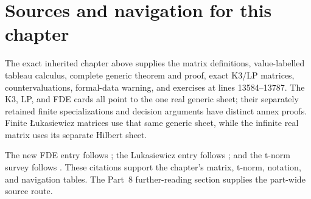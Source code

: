 \section{Sources and navigation for this chapter}

The exact inherited chapter above supplies the matrix definitions, value-labelled
tableau calculus, complete generic theorem and proof, exact K3/LP matrices,
countervaluations, formal-data warning, and exercises at lines 13584--13787.
The K3, LP, and FDE cards all point to the one real generic sheet; their
separately retained finite specializations and decision arguments have distinct
annex proofs.  Finite \L{}ukasiewicz matrices use that same generic sheet,
while the infinite real matrix uses its separate Hilbert sheet.

The new FDE entry follows \cite{Dunn1976,Belnap1977,OmoriWansing2017}; the
Lukasiewicz entry follows
\cite{LukasiewiczTarski1930,McNaughton1951,CignoliDOttavianoMundici2000}; and
the t-norm survey follows
\cite{Hajek1998,EstevaGodo2001,CintulaHajekNoguera2011}.  These citations
support the chapter's matrix, t-norm, notation, and navigation tables.  The Part~8
further-reading section supplies the part-wide source route.
